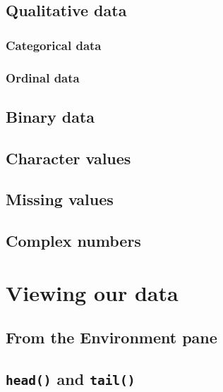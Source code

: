 \documentclass[english,10pt,a4paper,oneside]{book}
\begin{document}
\hypertarget{qualitative-data}{%
\subsection{Qualitative data}\label{qualitative-data}}

\hypertarget{categorical-data}{%
\subsubsection{Categorical data}\label{categorical-data}}

\hypertarget{ordinal-data}{%
\subsubsection{Ordinal data}\label{ordinal-data}}

\hypertarget{binary-data}{%
\subsection{Binary data}\label{binary-data}}

\hypertarget{character-values}{%
\subsection{Character values}\label{character-values}}

\hypertarget{missing-values}{%
\subsection{Missing values}\label{missing-values}}

\hypertarget{complex-numbers}{%
\subsection{Complex numbers}\label{complex-numbers}}

\hypertarget{viewing-our-data}{%
\section{Viewing our data}\label{viewing-our-data}}

\hypertarget{from-the-environment-pane}{%
\subsection{From the Environment pane}\label{from-the-environment-pane}}

\hypertarget{head-and-tail}{%
\subsection{\texorpdfstring{\texttt{head()} and \texttt{tail()}}{head() and tail()}}\label{head-and-tail}}
\end{document}
